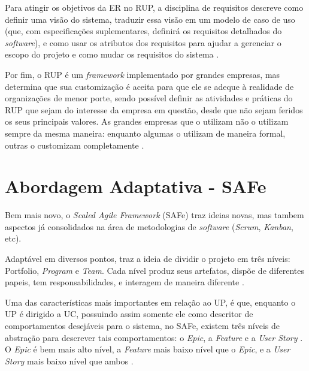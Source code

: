 Para atingir os objetivos da ER no RUP, a disciplina de requisitos descreve como definir uma visão do sistema, traduzir essa visão em um modelo de caso de uso (que, com especificações suplementares, definirá os requisitos detalhados do \emph{software}), e como usar os atributos dos requisitos para ajudar a gerenciar o escopo do projeto e como mudar os requisitos do sistema \cite[p. 182-183]{kruchten001}.


Por fim, o RUP é um \emph{framework} implementado por grandes empresas, mas determina que sua customização é aceita para que ele se adeque à realidade de organizações de menor porte, sendo possível definir as atividades e práticas do RUP que sejam do interesse da empresa em questão, desde que não sejam feridos os seus principais valores. As grandes empresas que o utilizam não o utilizam sempre da mesma maneira: enquanto algumas o utilizam de maneira formal, outras o customizam completamente \cite[p. 57]{kruchten001}.

\section{Abordagem Adaptativa - SAFe}
Bem mais novo, o \emph{Scaled Agile Framework} (SAFe) traz ideias novas, mas tambem aspectos já consolidados na área de metodologias de \emph{software} (\emph{Scrum}, \emph{Kanban}, etc).

Adaptável em diversos pontos, traz a ideia de dividir o projeto em três níveis: Portfolio, \emph{Program} e \emph{Team}. Cada nível produz seus artefatos, dispõe de diferentes papeis, tem responsabilidades, e interagem de maneira diferente \cite[p. 124-125]{safe001}.

Uma das características mais importantes em relação ao UP, é que, enquanto o UP é dirigido a UC, possuindo assim somente ele como descritor de comportamentos desejáveis para o sistema, no SAFe, existem três níveis de abstração para descrever tais comportamentos: o \emph{Epic}, a \emph{Feature} e a \emph{User Story} \cite[p. 182-183]{safe001}. O \emph{Epic} é bem mais alto nível, a \emph{Feature} mais baixo nível que o \emph{Epic}, e a \emph{User Story} mais baixo nível que ambos \cite[p. 182-183]{safe001}.


